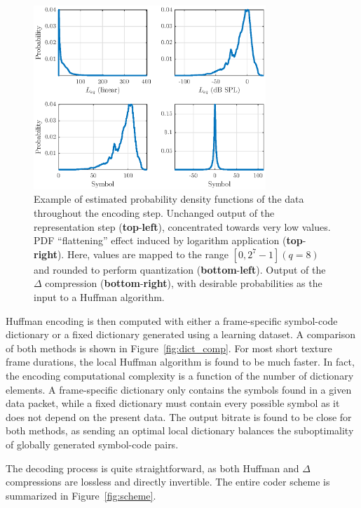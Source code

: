 \documentclass[sensors,article,accept,moreauthors,pdftex,10pt,a4paper]{mdpi}
\begin{document}
\begin{figure}[H]
	\centering
		\includegraphics[width=0.78\textwidth]{figures/pdf.eps}
	\caption{Example of estimated probability density functions of the data throughout the encoding step. Unchanged output of the representation step (\textbf{top}-\textbf{left}), concentrated towards very low values. PDF ``flattening'' effect induced by logarithm application (\textbf{top}-\textbf{right}). {Here,} values are mapped to the range $[0, 2^7-1] (q=8)$ and rounded to perform quantization (\textbf{bottom}-\textbf{left}). Output of the $\Delta$ compression  (\textbf{bottom}-\textbf{right}), with desirable probabilities as the input to a Huffman algorithm.}
	\label{fig:pdf}
\end{figure}

Huffman encoding is then computed with either a frame-specific symbol-code dictionary or a fixed dictionary generated using a learning dataset. A comparison of both methods is shown in Figure~\ref{fig:dict_comp}. For most short texture frame durations, the local Huffman algorithm is found to be much faster. In fact, the encoding computational complexity is a function of the number of dictionary elements. A frame-specific dictionary only contains the symbols found in a given data packet, while a fixed dictionary must contain every possible symbol as it does not depend on the present data. The output bitrate is found to be close for both methods, as sending an optimal local dictionary balances the suboptimality of globally generated symbol-code pairs.

The decoding process is quite straightforward, as both Huffman and $\Delta$ compressions are lossless and directly invertible. The entire coder scheme is summarized in Figure~\ref{fig:scheme}.
\vspace{-12pt}
\end{document}
